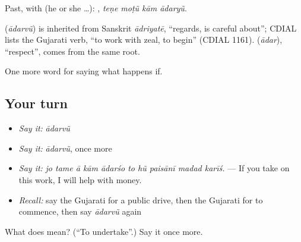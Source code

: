 Past, with  (he or she …):    , \emph{teṇe moṭũ kām ādaryũ}.

\begin{cousinweb}
\textbf{} (\emph{ādarvũ}) is inherited from Sanskrit \emph{ādriyatē}, \textquotedblleft{}regards, is careful about\textquotedblright{}; CDIAL lists the Gujarati verb, \textquotedblleft{}to work with zeal, to begin\textquotedblright{} (CDIAL 1161). \textbf{} (\emph{ādar}), \textquotedblleft{}respect\textquotedblright{}, comes from the same root.
\end{cousinweb}

\begin{grammarlens}[title={What you've built}]
One more word for saying what happens if.
\end{grammarlens}

\subsection*{Your turn}
\begin{itemize}
\raggedright
  \item \emph{Say it:} \emph{ādarvũ}
  \item \emph{Say it:} \emph{ādarvũ}, once more
  \item \emph{Say it:} \emph{jo tame ā kām ādarśo to hũ paisānī madad karīś.} — If you take on this work, I will help with money.
  \item \emph{Recall:} say the Gujarati for a public drive, then the Gujarati for to commence, then say \emph{ādarvũ} again
\end{itemize}

\begin{tcolorbox}[breakable,colback=teal!4,colframe=teal!35!black,title={Before you move on}]
What does  mean? (\textquotedblleft{}To undertake\textquotedblright{}.) Say it once more.
\end{tcolorbox}
